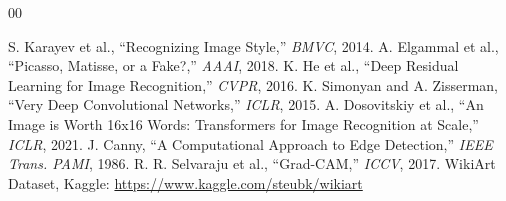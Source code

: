 \documentclass[conference]{IEEEtran}
\begin{document}
\begin{thebibliography}{00}

 S. Karayev et al., ``Recognizing Image Style,'' \textit{BMVC}, 2014.
 A. Elgammal et al., ``Picasso, Matisse, or a Fake?,'' \textit{AAAI}, 2018.
 K. He et al., ``Deep Residual Learning for Image Recognition,'' \textit{CVPR}, 2016.
 K. Simonyan and A. Zisserman, ``Very Deep Convolutional Networks,'' \textit{ICLR}, 2015.
 A. Dosovitskiy et al., ``An Image is Worth 16x16 Words: Transformers for Image Recognition at Scale,'' \textit{ICLR}, 2021.
 J. Canny, ``A Computational Approach to Edge Detection,'' \textit{IEEE Trans. PAMI}, 1986.
 R. R. Selvaraju et al., ``Grad-CAM,'' \textit{ICCV}, 2017.
 WikiArt Dataset, Kaggle: \url{https://www.kaggle.com/steubk/wikiart}

\end{thebibliography}
\end{document}

